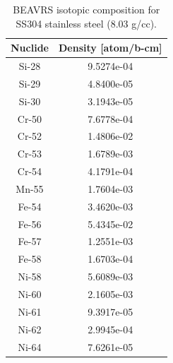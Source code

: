 \begin{appendices}
\begin{table}[h!]
  \centering
  \caption[BEAVRS isotopic composition for stainless steel]{BEAVRS isotopic composition for SS304 stainless steel (8.03 g/cc).}
  \footnotesize
  \label{table:chap7-beavrs-isotopes-3.1-stainless-steel}
  \vspace{6pt}
  \begin{tabular}{c c}
  \toprule
  \rowcolor{lightgray}
  {\bf Nuclide} &
  {\bf Density [atom/b-cm]} \\
  \midrule
  Si-28 & 9.5274e-04 \\
  Si-29 & 4.8400e-05 \\
  Si-30 & 3.1943e-05 \\
  Cr-50 & 7.6778e-04 \\
  Cr-52 & 1.4806e-02 \\
  Cr-53 & 1.6789e-03 \\
  Cr-54 & 4.1791e-04 \\
  Mn-55 & 1.7604e-03 \\
  Fe-54 & 3.4620e-03 \\
  Fe-56 & 5.4345e-02 \\
  Fe-57 & 1.2551e-03 \\
  Fe-58 & 1.6703e-04 \\
  Ni-58 & 5.6089e-03 \\
  Ni-60 & 2.1605e-03 \\
  Ni-61 & 9.3917e-05 \\
  Ni-62 & 2.9945e-04 \\
  Ni-64 & 7.6261e-05 \\
  \bottomrule
\end{tabular}
\end{table}


\end{appendices}
